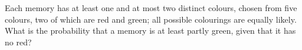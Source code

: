 Each memory has at least one and at most two distinct colours, chosen from five colours, two of which are red and green; all possible colourings are equally likely. What is the probability that a memory is at least partly green, given that it has no red?
